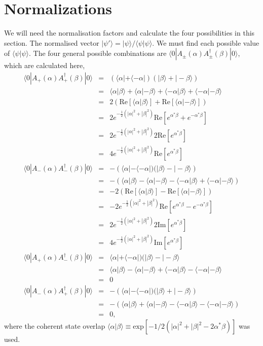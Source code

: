 \documentclass[aps,prl,twocolumn,amsmath,amssymb,nofootinbib,superscriptaddress]{revtex4}
\newcommand{\bra}[1]{\langle#1|}
\newcommand{\ket}[1]{|#1\rangle}
\newcommand{\ip}[2]{\langle{#1}|{#2}\rangle}
\begin{document}
\section{Normalizations}
We will need the normalisation factors and calculate the four possibilities in this section. The normalised vector $\ket{\psi'}= \ket{\psi}/ \ip{\psi}{\psi}$. We must find each possible value of $\ip{\psi}{\psi}$. The four general possible combinations are $\bra{0}A_\pm(\alpha)A^\dag_\pm(\beta)\ket{0}$, which are calculated here,
\begin{eqnarray}
\bra{0}A_+(\alpha)A^\dag_+(\beta)\ket{0}&=& (\bra{\alpha}+\bra{-\alpha})(\ket{\beta}+\ket{-\beta}) \nonumber \\
&=& \ip{\alpha}{\beta}+\ip{\alpha}{-\beta}+\ip{-\alpha}{\beta}+\ip{-\alpha}{-\beta} \nonumber \\
&=& 2\left(\mathrm{Re}\left[\ip{\alpha}{\beta}\right]+\mathrm{Re}\left[\ip{\alpha}{-\beta}\right]\right) \nonumber \\
&=& 2 e^{-\frac{1}{2}(|\alpha|^2+|\beta|^2)}\mathrm{Re}\left[e^{\alpha^*\beta}+e^{-\alpha^*\beta} \right] \nonumber \\
&=& 2 e^{-\frac{1}{2}(|\alpha|^2+|\beta|^2)} 2\mathrm{Re}\left[e^{\alpha^*\beta}\right] \nonumber \\
&=& 4 e^{-\frac{1}{2}(|\alpha|^2+|\beta|^2)} \mathrm{Re}\left[e^{\alpha^*\beta}\right] \\
\bra{0}A_-(\alpha)A^\dag_-(\beta)\ket{0}&=& -\left(\bra{\alpha}-\bra{-\alpha})(\ket{\beta}-\ket{-\beta}\right) \nonumber \\
&=& -\left(\ip{\alpha}{\beta}-\ip{\alpha}{-\beta}-\ip{-\alpha}{\beta}+\ip{-\alpha}{-\beta}\right) \nonumber \\
&=& -2\left(\mathrm{Re}\left[\ip{\alpha}{\beta}\right]-\mathrm{Re}\left[\ip{\alpha}{-\beta}\right]\right) \nonumber \\
&=& -2 e^{-\frac{1}{2}(|\alpha|^2+|\beta|^2)}\mathrm{Re}\left[e^{\alpha^*\beta}-e^{-\alpha^*\beta} \right] \nonumber \\
&=& 2 e^{-\frac{1}{2}(|\alpha|^2+|\beta|^2)} 2\mathrm{Im}\left[e^{\alpha^*\beta}\right] \nonumber \\
&=& 4 e^{-\frac{1}{2}(|\alpha|^2+|\beta|^2)} \mathrm{Im}\left[e^{\alpha^*\beta}\right] \\
\bra{0}A_+(\alpha)A^\dag_-(\beta)\ket{0}&=& \bra{\alpha}+\bra{-\alpha})(\ket{\beta}-\ket{-\beta} \nonumber \\
&=& \ip{\alpha}{\beta}-\ip{\alpha}{-\beta}+\ip{-\alpha}{\beta}-\ip{-\alpha}{-\beta} \nonumber \\
&=& 0 \\
\bra{0}A_-(\alpha)A^\dag_+(\beta)\ket{0}&=& -\left(\bra{\alpha}-\bra{-\alpha})(\ket{\beta}+\ket{-\beta}\right) \nonumber \\
&=& -\left(\ip{\alpha}{\beta}+\ip{\alpha}{-\beta}-\ip{-\alpha}{\beta}-\ip{-\alpha}{-\beta}\right) \nonumber \\
&=& 0,
\end{eqnarray}
where the coherent state overlap $\ip{\alpha}{\beta}\equiv\mathrm{exp}\left[-1/2(|\alpha|^2+|\beta|^2 - 2\alpha^*\beta) \right] $ was used.
\end{document}
